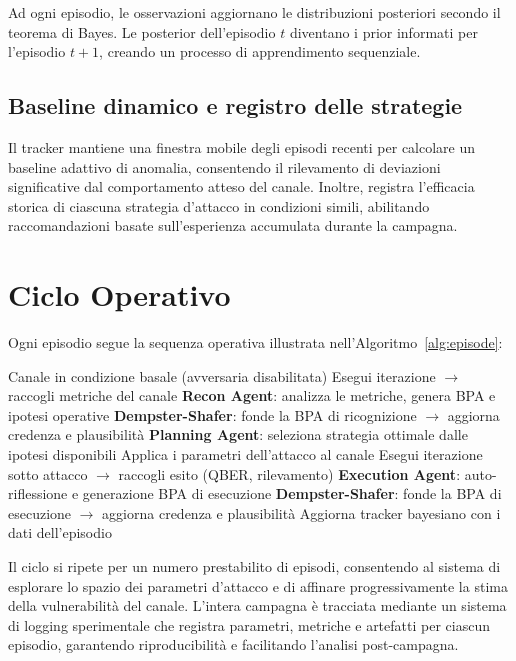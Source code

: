 Ad ogni episodio, le osservazioni aggiornano le distribuzioni posteriori secondo il teorema di Bayes. Le posterior dell'episodio $t$ diventano i prior informati per l'episodio $t+1$, creando un processo di apprendimento sequenziale.

\subsection{Baseline dinamico e registro delle strategie}
Il tracker mantiene una finestra mobile degli episodi recenti per calcolare un baseline adattivo di anomalia, consentendo il rilevamento di deviazioni significative dal comportamento atteso del canale. Inoltre, registra l'efficacia storica di ciascuna strategia d'attacco in condizioni simili, abilitando raccomandazioni basate sull'esperienza accumulata durante la campagna.

\section{Ciclo Operativo}
\label{sec:operational-cycle}

Ogni episodio segue la sequenza operativa illustrata nell'Algoritmo~\ref{alg:episode}:

\begin{algorithm}[htbp]
    \caption{Ciclo operativo di un episodio nel framework \textsc{Fringe}}
    \label{alg:episode}
    \begin{algorithmic}[1]
        \STATE Canale in condizione basale (avversaria disabilitata)
        \STATE Esegui iterazione $\to$ raccogli metriche del canale
        \STATE \textbf{Recon Agent}: analizza le metriche, genera BPA e ipotesi operative
        \STATE \textbf{Dempster-Shafer}: fonde la BPA di ricognizione $\to$ aggiorna credenza e plausibilità
        \STATE \textbf{Planning Agent}: seleziona strategia ottimale dalle ipotesi disponibili
        \STATE Applica i parametri dell'attacco al canale
        \STATE Esegui iterazione sotto attacco $\to$ raccogli esito (QBER, rilevamento)
        \STATE \textbf{Execution Agent}: auto-riflessione e generazione BPA di esecuzione
        \STATE \textbf{Dempster-Shafer}: fonde la BPA di esecuzione $\to$ aggiorna credenza e plausibilità
        \STATE Aggiorna tracker bayesiano con i dati dell'episodio
    \end{algorithmic}
\end{algorithm}

Il ciclo si ripete per un numero prestabilito di episodi, consentendo al sistema di esplorare lo spazio dei parametri d'attacco e di affinare progressivamente la stima della vulnerabilità del canale. L'intera campagna è tracciata mediante un sistema di logging sperimentale che registra parametri, metriche e artefatti per ciascun episodio, garantendo riproducibilità e facilitando l'analisi post-campagna.

